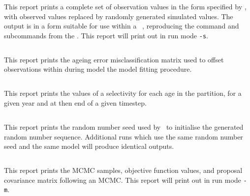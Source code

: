 This report prints a complete set of observation values in the form specified by , with observed values replaced by randomly generated simulated values. The output is in a form  suitable for use within a \CNAME\ \config, reproducing the command and subcommands from the \config. This report will print out in run mode \texttt{-s}.

\subsection{}\label{sec:ageingerrorreport}

This report prints the ageing error misclassification matrix used to offset observations within during model the model fitting procedure.

\subsection{}

This report prints the values of a selectivity for each age in the partition, for a given year and at then end of a given timestep.

\subsection{}

This report prints the random number seed used by \CNAME\ to initialise the generated random number sequence. Additional runs which use the same random number seed and the same model will produce identical outputs.

\subsection{}

This report prints the MCMC samples, objective function values, and proposal covariance matrix following an MCMC. This report will print out in run mode \texttt{-m}.

\subsection{}

